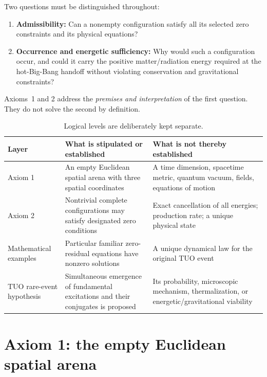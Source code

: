 \documentclass[11pt,a4paper]{article}
\theoremstyle{tmon}
\theoremstyle{definition}
\begin{document}
Two questions must be distinguished throughout:
\begin{enumerate}
\item \textbf{Admissibility:} Can a nonempty configuration satisfy all its selected zero constraints and its physical equations?
\item \textbf{Occurrence and energetic sufficiency:} Why would such a configuration occur, and could it carry the positive matter/radiation energy required at the hot-Big-Bang handoff without violating conservation and gravitational constraints?
\end{enumerate}
Axioms~1 and 2 address the \emph{premises and interpretation} of the first question. They do not solve the second by definition.

\begin{table}[h]
\centering\small
\begin{tabularx}{\linewidth}{@{}p{.17\linewidth}YY@{}}\toprule
\textbf{Layer} & \textbf{What is stipulated or established} & \textbf{What is not thereby established}\\\midrule
Axiom 1 & An empty Euclidean spatial arena with three spatial coordinates & A time dimension, spacetime metric, quantum vacuum, fields, equations of motion\\
Axiom 2 & Nontrivial complete configurations may satisfy designated zero conditions & Exact cancellation of all energies; production rate; a unique physical state\\
Mathematical examples & Particular familiar zero-residual equations have nonzero solutions & A unique dynamical law for the original TUO event\\
TUO rare-event hypothesis & Simultaneous emergence of fundamental excitations and their conjugates is proposed & Its probability, microscopic mechanism, thermalization, or energetic/gravitational viability\\\bottomrule
\end{tabularx}
\caption{Logical levels are deliberately kept separate.}\label{tab:levels}
\end{table}

\section{Axiom 1: the empty Euclidean spatial arena}
\end{document}

